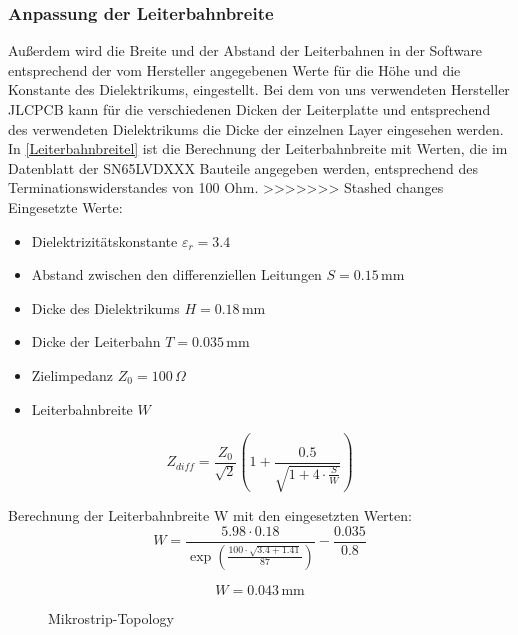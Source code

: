 \subsubsection{Anpassung der Leiterbahnbreite}
Außerdem wird die Breite und der Abstand der Leiterbahnen in der Software entsprechend der vom Hersteller angegebenen Werte für die Höhe und die Konstante des Dielektrikums, eingestellt. Bei dem von uns verwendeten Hersteller JLCPCB kann für die verschiedenen Dicken der Leiterplatte und entsprechend des verwendeten Dielektrikums die Dicke der einzelnen Layer eingesehen werden.
In \ref{Leiterbahnbreitel} ist die Berechnung der Leiterbahnbreite mit Werten, die im Datenblatt der SN65LVDXXX Bauteile angegeben werden, entsprechend des Terminationswiderstandes von 100 Ohm.
>>>>>>> Stashed changes
\newline
Eingesetzte Werte:
\begin{itemize}
	\item Dielektrizitätskonstante \( \varepsilon_r = 3.4 \)
	\item Abstand zwischen den differenziellen Leitungen \( S = 0.15 \, \text{mm} \)
	\item Dicke des Dielektrikums \( H = 0.18 \, \text{mm} \)
	\item Dicke der Leiterbahn \( T = 0.035 \, \text{mm} \)
	\item Zielimpedanz \( Z_0 = 100 \, \Omega \)
	\item Leiterbahnbreite \( W \) 
\end{itemize}



\begin{equation} \label{Impedanz}
	Z_{diff} = \frac{Z_0}{\sqrt{2}} \left( 1 + \frac{0.5}{\sqrt{1 + 4\cdot \frac{S}{W}}} \right)
\end{equation}


Berechnung der Leiterbahnbreite W mit den eingesetzten Werten:
\begin{equation} \label{Leiterbahnbreite}
W = \frac{5.98 \cdot 0.18}{\exp\left(\frac{100 \cdot \sqrt{3.4 + 1.41}}{87}\right)} - \frac{0.035}{0.8}
\end{equation}

\begin{equation} \label{Leiterbahnbreite}
	W = 0.043 \, \text{mm}
\end{equation}


\begin{figure}[H]
	\centering    
	\caption{Mikrostrip-Topology}
	\label{MikrostripTopology}
\end{figure}

